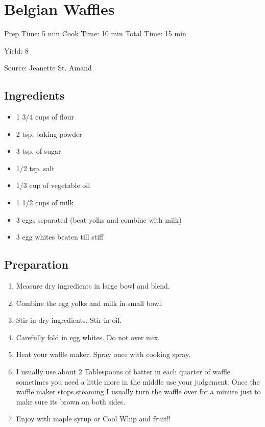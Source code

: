 \section{Belgian Waffles}

\begin{center}
Prep Time: 5 min
Cook Time: 10 min
Total Time: 15 min

\noindent Yield: 8

\vspace{1em}

Source: Jeanette St. Amand
\end{center}

\subsection{Ingredients}
\begin{multicols}{2}
\begin{itemize}
    \item 1 3/4 cups of flour
    \item 2 tsp. baking powder
    \item 3 tsp. of sugar
    \item 1/2 tsp. salt
    \item 1/3 cup of vegetable oil
    \item 1 1/2 cups of milk
    \item 3 eggs separated (beat yolks and combine with milk)
    \item 3 egg whites beaten till stiff
\end{itemize}
\end{multicols}

\subsection{Preparation}
\begin{enumerate}
    \item Measure dry ingredients in large bowl and blend.
    \item Combine the egg yolks and milk in small bowl.
    \item Stir in dry ingredients. Stir in oil.
    \item Carefully fold in egg whites. Do not over mix.
    \item Heat your waffle maker. Spray once with cooking spray.
    \item I usually use about 2 Tablespoons of batter in each quarter of waffle sometimes you need a little more in the middle use your judgement. Once the waffle maker stops steaming I usually turn the waffle over for a minute just to make sure its brown on both sides.
    \item Enjoy with maple syrup or Cool Whip and fruit!!
\end{enumerate}

